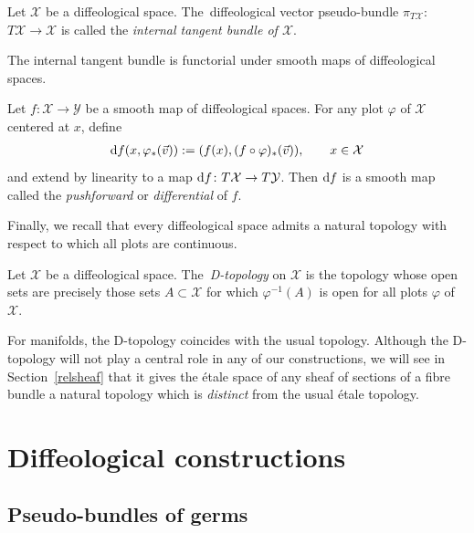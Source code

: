 \documentclass[pdftex]{sigma}
\numberwithin{equation}{section}
\def\YY{{\mathcal{Y}}}
\def\XX{{\mathcal{X}}}
\begin{document}
\begin{Definition}
Let $\XX$ be a diffeological space. The~diffeological vector pseudo-bundle $\pi_{T\XX}$: $T\XX\rightarrow \XX$ is called the \textit{internal tangent bundle of $\XX$}.
\end{Definition}

The internal tangent bundle is functorial under smooth maps of diffeological spaces.

\begin{Definition}\label{differential}
Let $f\colon \XX\rightarrow \YY$ be a smooth map of diffeological spaces. For any plot $\varphi$ of $\XX$ centered at $x$, define
\begin{gather*}
{\rm d}f(x,\varphi_{*}(\vec{v})):=(f(x),(f\circ\varphi)_{*}(\vec{v})),\qquad x\in \XX
\end{gather*}
and extend by linearity to a map ${\rm d}f\colon T\XX\rightarrow T\YY$. Then ${\rm d}f$ is a smooth map~\cite[Proposition~4.8]{cw} called the \textit{pushforward} or \textit{differential} of $f$.
\end{Definition}

Finally, we recall that every diffeological space admits a natural topology with respect to which all plots are continuous.

\begin{Definition}\label{Dtop}
Let $\XX$ be a diffeological space. The~\textit{D-topology} on $\XX$ is the topology whose open sets are precisely those sets $A\subset \XX$ for which $\varphi^{-1}(A)$ is open for all plots $\varphi$ of $\XX$.
\end{Definition}

For manifolds, the D-topology coincides with the usual topology. Although the D-topology will not play a central role in any of our constructions, we will see in Section~\ref{relsheaf} that it gives the \'{e}tale space of any sheaf of sections of a fibre bundle a natural topology which is \textit{distinct} from the usual \'{e}tale topology.

\section{Diffeological constructions}\label{sec3}

\subsection{Pseudo-bundles of germs}\label{pseudobundlesofgerms}
\end{document}
